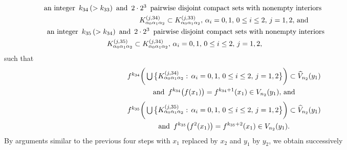 \documentclass[12pt]{article}
\newcommand{\al}{\alpha}
\begin{document}
\begin{multline*}
$$
\text{an integer} \,\,\, k_{34} \, (> k_{33}) \,\,\, \text{and} \,\,\, 2 \cdot 2^3 \,\,\, \text{pairwise disjoint compact sets with nonempty interiors}\qquad\qquad\qquad\qquad\qquad\quad\,\,\, \\ 
K_{\al_0\al_1\al_2}^{(j,34)} \subset K_{\al_0\al_1\al_2}^{(j,33)}, \, \al_i = 0, 1, \, 0 \le i \le 2, \, j = 1, 2, \, \text{and}  \\
\,\,\,\,\, \text{an integer} \,\,\, k_{35} \, (> k_{34}) \,\,\, \text{and} \,\,\, 2 \cdot 2^3 \,\,\, \text{pairwise disjoint compact sets with nonempty interiors}\qquad\qquad\qquad\qquad\qquad\quad\,\,\, \\ 
K_{\al_0\al_1\al_2}^{(j,35)} \subset K_{\al_0\al_1\al_2}^{(j,34)}, \, \al_i = 0, 1, \, 0 \le i \le 2, \, j = 1, 2, \qquad\qquad\qquad\qquad\qquad\quad
$$
\end{multline*}
such that
\begin{multline*}
$$
f^{k_{34}}\bigg(\bigcup \big\{ K_{\al_0\al_1\al_2}^{(j,34)}: \, \al_i = 0, 1, \, 0 \le i \le 2, \, j = 1, 2 \big\}\bigg) \subset \widehat  V_{n_2}(y_1) \\ \text{and} \,\,\, f^{k_{34}}\big(f(x_1)\big) = f^{k_{34}+1}(x_1) \in V_{n_2}(y_1), \, \text{and}
$$
\end{multline*}
\begin{multline*}
$$
f^{k_{35}}\bigg(\bigcup \big\{ K_{\al_0\al_1\al_2}^{(j,35)}: \, \al_i = 0, 1, \, 0 \le i \le 2, \, j = 1, 2 \big\}\bigg) \subset \widehat  V_{n_2}(y_1) \\ \text{and} \,\,\, f^{k_{35}}\big(f^2(x_1)\big) = f^{k_{35}+2}(x_1) \in V_{n_2}(y_1).
$$
\end{multline*}
\indent By arguments similar to the previous four steps with $x_1$ replaced by $x_2$ and $y_1$ by $y_2$, we obtain successively
\end{document}
